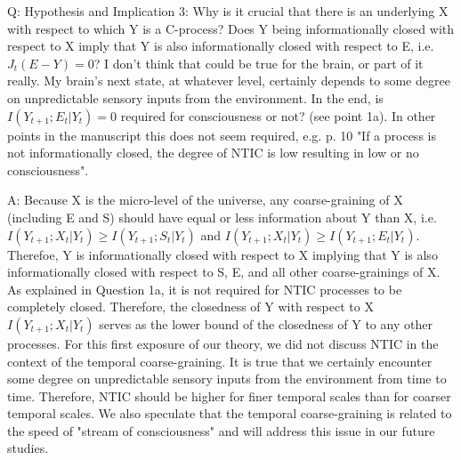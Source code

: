 \documentclass[utf8]{article}
\newcounter{cQuestion}[section]
\newenvironment{question}
    {\refstepcounter{cQuestion}\color{Blue}\noindent\newline Q\thecQuestion:}
    {~\newline}
\newenvironment{ans}  
    {\color{Black}\noindent A:}
    {~\newline}
\begin{document}
       
        
        \begin{question}
            Hypothesis and Implication 3: Why is it crucial that there is an underlying X with respect to which Y is a C-process? Does Y being informationally closed with respect to X imply that Y is also informationally closed with respect to E, i.e. $J_t(E-Y) = 0$? I don't think that could be true for the brain, or part of it really. My brain's next state, at whatever level, certainly depends to some degree on unpredictable sensory inputs from the environment. In the end, is $I(Y_{t+1}; E_t|Y_t) = 0$ required for consciousness or not? (see point 1a). In other points in the manuscript this does not seem required, e.g. p. 10 "If a process is not informationally closed, the degree of NTIC is low resulting in low or no consciousness".        
        \end{question}
        
        \begin{ans}        	
            Because X is the micro-level of the universe, any coarse-graining of X (including E and S) should have equal or less information about Y than X, i.e. $I(Y_{t+1}; X_t|Y_t) \geq I(Y_{t+1}; S_t|Y_t)$ and  $I(Y_{t+1}; X_t|Y_t) \geq I(Y_{t+1}; E_t|Y_t)$. Therefoe, Y is informationally closed with respect to X implying that Y is also informationally closed with respect to S, E, and all other coarse-grainings of X. As explained in Question 1a, it is not required for NTIC processes to be completely closed. Therefore, the closedness of Y with respect to X $I(Y_{t+1}; X_t|Y_t)$ serves as the lower bound of the closedness of Y to any other processes. 
            For this first exposure of our theory, we did not discuss NTIC in the context of the temporal coarse-graining. It is true that we certainly encounter some degree on unpredictable sensory inputs from the environment from time to time. Therefore, NTIC should be higher for finer temporal scales than for coarser temporal scales. We also speculate that the temporal coarse-graining is related to the speed of "stream of consciousness" and will address this issue in our future studies. 
        \end{ans}
        
\end{document}
